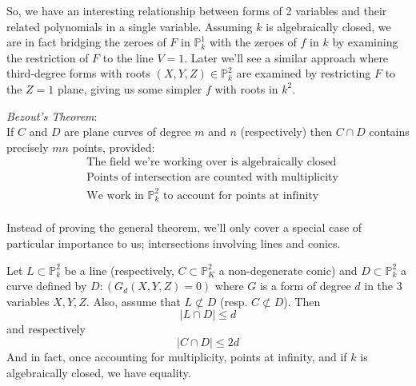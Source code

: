 So, we have an interesting relationship between forms of 2 variables and their
related polynomials in a single variable. Assuming $k$ is algebraically closed, we are in fact
bridging the zeroes of $F$ in $\mathbb{P}^1_k$ with the zeroes of $f$
in $k$ by examining the restriction of $F$ to the line $V=1$.
Later we'll see a similar approach where third-degree forms with roots
$(X,Y,Z) \in \mathbb{P}^2_k$ are examined by restricting $F$ to the
$Z=1$ plane, giving us some simpler $f$ with roots in $k^2$.

\begin{theorem}
\emph{Bezout's Theorem}:\\

If $C$ and $D$ are plane curves of degree $m$ and $n$ (respectively)
then $C \cap D$ contains precisely $mn$ points, provided:
\begin{align*}
&\text{The field we're working over is algebraically closed} \tag{i}\\
&\text{Points of intersection are counted with multiplicity} \tag{ii}\\
&\text{We work in $\mathbb{P}^2_k$ to account for points at infinity} \tag{iii}\\
\end{align*}
\end{theorem}

Instead of proving the general theorem, we'll only cover a special 
case of particular importance to us; intersections involving
lines and conics.

\begin{theorem}
Let $L \subset \mathbb{P}^2_k$ be a line (respectively, $C \subset \mathbb{P}^2_K$ a non-degenerate conic)
and $D \subset \mathbb{P}^2_k$ a curve defined by $D:(G_d(X,Y,Z)=0)$ where $G$ is
a form of degree $d$ in the 3 variables $X,Y,Z$. Also, assume that $L \not\subset D$ (resp. $C \not\subset D$).
Then
\[
|L \cap D| \le d
\]
and respectively
\[
|C \cap D| \le 2d
\]
And in fact, once accounting for multiplicity, points at infinity, and if $k$ is algebraically
closed, we have equality.
\end{theorem}

